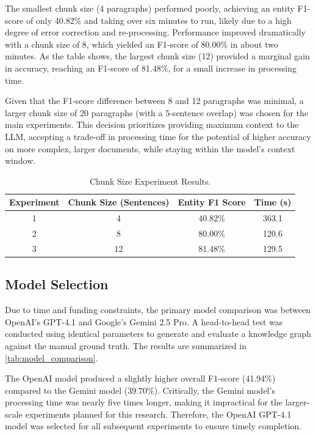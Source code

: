 The smallest chunk size (4 paragraphs) performed poorly, achieving an entity F1-score of only 40.82\% and taking over six minutes to run, likely due to a high degree of error correction and re-processing. Performance improved dramatically with a chunk size of 8, which yielded an F1-score of 80.00\% in about two minutes. As the table shows, the largest chunk size (12) provided a marginal gain in accuracy, reaching an F1-score of 81.48\%, for a small increase in processing time.

Given that the F1-score difference between 8 and 12 paragraphs was minimal, a larger chunk size of 20 paragraphs (with a 5-sentence overlap) was chosen for the main experiments. This decision prioritizes providing maximum context to the LLM, accepting a trade-off in processing time for the potential of higher accuracy on more complex, larger documents, while staying within the model's context window.

\begin{table}[!htbp]
\centering
\begin{tabular}{@{}cccc@{}}
\toprule
\textbf{Experiment} & \textbf{Chunk Size (Sentences)} & \textbf{Entity F1 Score} & \textbf{Time (s)} \\ \midrule
1 & 4  & 40.82\% & 363.1 \\
2 & 8  & 80.00\% & 120.6 \\
3 & 12 & 81.48\% & 129.5 \\ \bottomrule
\end{tabular}
\caption{Chunk Size Experiment Results.}
\label{tab:chunk_size_results}
\end{table}

\subsection{Model Selection}
Due to time and funding constraints, the primary model comparison was between OpenAI's GPT-4.1 and Google's Gemini 2.5 Pro. A head-to-head test was conducted using identical parameters to generate and evaluate a knowledge graph against the manual ground truth. The results are summarized in \cref{tab:model_comparison}.

The OpenAI model produced a slightly higher overall F1-score (41.94\%) compared to the Gemini model (39.70\%). Critically, the Gemini model's processing time was nearly five times longer, making it impractical for the larger-scale experiments planned for this research. Therefore, the OpenAI GPT-4.1 model was selected for all subsequent experiments to ensure timely completion.

